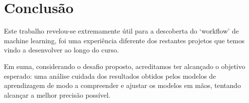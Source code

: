 \section*{Conclusão}

Este trabalho revelou-se extremamente útil para a descoberta do `workflow' de machine learning, foi uma experiência diferente dos restantes projetos que temos vindo a desenvolver ao longo do curso.

Em suma, considerando o desafio proposto, acreditamos ter alcançado o objetivo esperado: uma análise cuidada dos resultados obtidos pelos modelos de aprendizagem de modo a compreender e ajustar os modelos em mãos, tentando alcançar a melhor precisão possível.